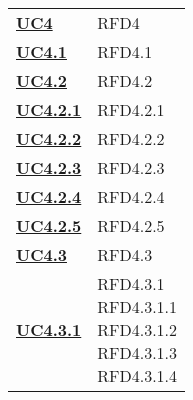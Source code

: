\begin{longtable}[H]{| >{\centering\bfseries}p{8cm} | >{\centering\arraybackslash}p{8cm} |}
    \hyperref[sub:uc4]{UC4}          & RFD4                                                                      \\

    \hyperref[ssub:uc4.1]{UC4.1}     & RFD4.1                                                                    \\

    \hyperref[ssub:uc4.2]{UC4.2}     & RFD4.2                                                                    \\

    \hyperref[par:uc4.2.1]{UC4.2.1}  & RFD4.2.1                                                                  \\

    \hyperref[par:uc4.2.2]{UC4.2.2}  & RFD4.2.2                                                                  \\

    \hyperref[par:uc4.2.3]{UC4.2.3}  & RFD4.2.3                                                                  \\

    \hyperref[par:uc4.2.4]{UC4.2.4}  & RFD4.2.4                                                                  \\

    \hyperref[par:uc4.2.5]{UC4.2.5}  & RFD4.2.5                                                                  \\

    \hyperref[ssub:uc4.3]{UC4.3}     & RFD4.3                                                                    \\

    \hyperref[par:uc4.3.1]{UC4.3.1}  & \makecell{
        \rule{0pt}{4ex}
    RFD4.3.1                                                                                                     \\
    RFD4.3.1.1                                                                                                   \\
    RFD4.3.1.2                                                                                                   \\
    RFD4.3.1.3                                                                                                   \\
        RFD4.3.1.4
        \rule{0pt}{4ex}
    }                                                                                                            \\


\end{longtable}
